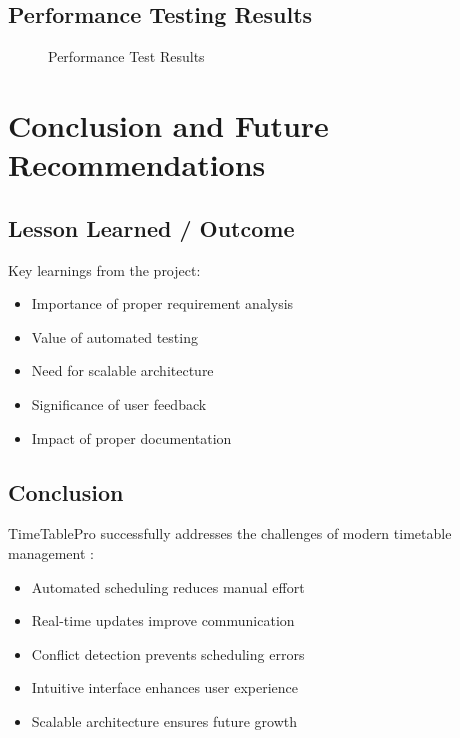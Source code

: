 \documentclass[12pt,a4paper]{report}
\begin{document}
\section{Performance Testing Results}
\begin{figure}[H]
\centering
{}
\caption{Performance Test Results}
\label{fig:performance}
\end{figure}

\chapter{Conclusion and Future Recommendations}
\section{Lesson Learned / Outcome}
Key learnings from the project:
\begin{itemize}
    \item Importance of proper requirement analysis
    \item Value of automated testing
    \item Need for scalable architecture
    \item Significance of user feedback
    \item Impact of proper documentation
\end{itemize}

\section{Conclusion}
TimeTablePro successfully addresses the challenges of modern timetable management \cite{user_experience}:
\begin{itemize}
    \item Automated scheduling reduces manual effort
    \item Real-time updates improve communication
    \item Conflict detection prevents scheduling errors \cite{conflict_detection}
    \item Intuitive interface enhances user experience
    \item Scalable architecture ensures future growth
\end{itemize}
\end{document}
